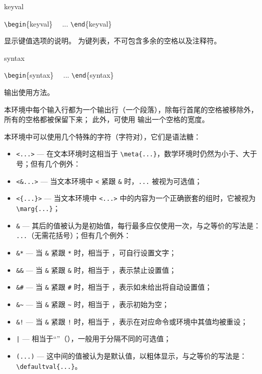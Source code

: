 \documentclass{cusdoc}
\begin{document}
\begin{function}[type=environment]{keyval}
\begin{syntax}
  \verb|\begin|\{keyval\}  
  ~~... 
  \verb|\end|\{keyval\}
\end{syntax}
显示键值选项的说明。 为键列表，不可包含多余的空格以及注释符。
\end{function}

\begin{function}[type=environment]{syntax}
\begin{syntax}
  \verb|\begin|\{syntax\}
  ~~... 
  \verb|\end|\{syntax\}
\end{syntax}
输出使用方法。

本环境中每个输入行都为一个输出行（一个段落），除每行首尾的空格被移除外，所有的空格都被保留下来；
此外，可使用 \V{~} 输出一个空格的宽度。
\end{function}

本环境中可以使用几个特殊的字符（字符对），它们是语法糖：
\begin{itemize}[nosep]
  \item \verb|<...>| --- 在文本环境时这相当于 \verb|\meta{...}|，数学环境时仍然为小于、大于号；但有几个例外：
  \item \verb|<&...>| --- 当文本环境中 \verb|<| 紧跟 \verb|&| 时，\verb|...| 被视为可选值；
  \item \verb|<{...}>| --- 当文本环境中 \verb|<...>| 中的内容为一个正确嵌套的组时，它被视为 \verb|\marg{...}|；
  \item \verb|&| --- 其后的值被认为是初始值，每行最多应仅使用一次，与之等价的写法是： \verb| ...|（无需花括号）；但有几个例外：
  \item \verb|&*| --- 当 \verb|&| 紧跟 \verb|*| 时，相当于 ，可自行设置文字；
  \item \verb|&&| --- 当 \verb|&| 紧跟 \verb|&| 时，相当于 ，表示禁止设置值；
  \item \verb|&#| --- 当 \verb|&| 紧跟 \verb|#| 时，相当于 ，表示如未给出将自动设置值；
  \item \verb|&~| --- 当 \verb|&| 紧跟 \verb|~| 时，相当于 ，表示初始为空；
  \item \verb|&!| --- 当 \verb|&| 紧跟 \verb|!| 时，相当于 ，表示在对应命令或环境中其值均被重设；
  \item \verb+|+ --- 相当于“\orbar”（），一般用于分隔不同的可选值；
  \item \verb|(...)| --- 这中间的值被认为是默认值，以粗体显示，与之等价的写法是：\\ \verb|\defaultval{...}|。
\end{itemize}
\end{document}
